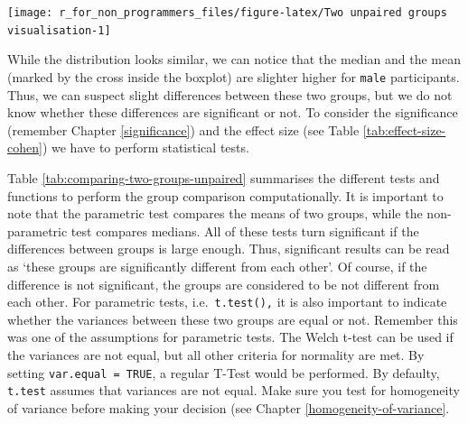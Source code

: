 \documentclass[
]{book}
\begin{document}
\begin{center}\texttt{[image: r\_for\_non\_programmers\_files/figure-latex/Two unpaired groups visualisation-1]} \end{center}

While the distribution looks similar, we can notice that the median and the mean (marked by the cross inside the boxplot) are slighter higher for \texttt{male} participants. Thus, we can suspect slight differences between these two groups, but we do not know whether these differences are significant or not. To consider the significance (remember Chapter \ref{significance}) and the effect size (see Table \ref{tab:effect-size-cohen}) we have to perform statistical tests.

Table \ref{tab:comparing-two-groups-unpaired} summarises the different tests and functions to perform the group comparison computationally. It is important to note that the parametric test compares the means of two groups, while the non-parametric test compares medians. All of these tests turn significant if the differences between groups is large enough. Thus, significant results can be read as `these groups are significantly different from each other'. Of course, if the difference is not significant, the groups are considered to be not different from each other. For parametric tests, i.e.~\texttt{t.test(),} it is also important to indicate whether the variances between these two groups are equal or not. Remember this was one of the assumptions for parametric tests. The Welch t-test can be used if the variances are not equal, but all other criteria for normality are met. By setting \texttt{var.equal\ =\ TRUE}, a regular T-Test would be performed. By defaulty, \texttt{t.test} assumes that variances are not equal. Make sure you test for homogeneity of variance before making your decision (see Chapter \ref{homogeneity-of-variance}.
\end{document}
